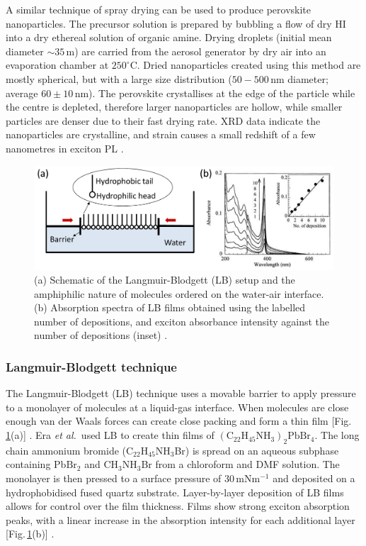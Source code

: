 A similar technique of spray drying can be used to produce perovskite nanoparticles. The precursor solution is prepared by bubbling a flow of dry HI into a dry ethereal solution of organic amine. Drying droplets (initial mean diameter $\sim 35\,$\textmu m) are carried from the aerosol generator by dry air into an evaporation chamber at $250^{\circ}$C. Dried nanoparticles created using this method are mostly spherical, but with a large size distribution ($50-500$\,nm diameter; average $60\pm10$\,nm). The perovskite crystallises at the edge of the particle while the centre is depleted, therefore larger nanoparticles are hollow, while smaller particles are denser due to their fast drying rate. XRD data indicate the nanoparticles are crystalline, and strain causes a small redshift of a few nanometres in exciton PL \cite{Audebert2009a}.

\begin{figure} [h!]
\centering
\includegraphics[width=\textwidth]{Fig6}
\caption{(a) Schematic of the Langmuir-Blodgett (LB) setup and the amphiphilic nature of molecules ordered on the water-air interface. (b) Absorption spectra of LB films obtained using the labelled number of depositions, and exciton absorbance intensity against the number of depositions (inset) \cite{Era2000}.}
\label{2Fig6}
\end{figure}
\subsubsection {Langmuir-Blodgett technique}
The Langmuir-Blodgett (LB) technique uses a movable barrier to apply pressure to a monolayer of molecules at a liquid-gas interface. When molecules are close enough van der Waals forces can create close packing and form a thin film [Fig.\,\ref{2Fig6}(a)] \cite{Mitzi2001b}. Era \textit{et al.}\ used LB to create thin films of $(\textrm{C}_{22}\textrm{H}_{45}\textrm{NH}_3)_2\textrm{PbBr}_4$. The long chain ammonium bromide ($\textrm{C}_{22}\textrm{H}_{45}\textrm{NH}_3$Br) is spread on an aqueous subphase containing Pb$\textrm{Br}_2$ and $\textrm{CH}_3\textrm{NH}_3$Br from a chloroform and DMF solution. The monolayer is then pressed to a surface pressure of 30\,mN$\textrm{m}^{-1}$ and deposited on a hydrophobidised fused quartz substrate. Layer-by-layer deposition of LB films allows for control over the film thickness. Films show strong exciton absorption peaks, with a linear increase in the absorption intensity for each additional layer [Fig.\,\ref{2Fig6}(b)] \cite{Era2000}.

